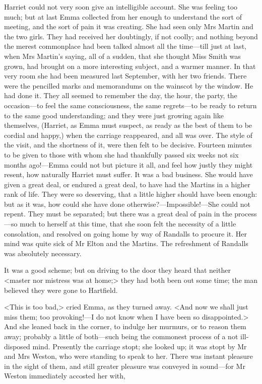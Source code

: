 Harriet could not very soon give an intelligible account. She was feeling too much; but at last Emma collected from her enough to understand the sort of meeting, and the sort of pain it was creating. She had seen only Mrs Martin and the two girls. They had received her doubtingly, if not coolly; and nothing beyond the merest commonplace had been talked almost all the time—till just at last, when Mrs Martin's saying, all of a sudden, that she thought Miss Smith was grown, had brought on a more interesting subject, and a warmer manner. In that very room she had been measured last September, with her two friends. There were the pencilled marks and memorandums on the wainscot by the window. He had done it. They all seemed to remember the day, the hour, the party, the occasion—to feel the same consciousness, the same regrets—to be ready to return to the same good understanding; and they were just growing again like themselves, (Harriet, as Emma must suspect, as ready as the best of them to be cordial and happy,) when the carriage reappeared, and all was over. The style of the visit, and the shortness of it, were then felt to be decisive. Fourteen minutes to be given to those with whom she had thankfully passed six weeks not six months ago!—Emma could not but picture it all, and feel how justly they might resent, how naturally Harriet must suffer. It was a bad business. She would have given a great deal, or endured a great deal, to have had the Martins in a higher rank of life. They were so deserving, that a little higher should have been enough: but as it was, how could she have done otherwise?—Impossible!—She could not repent. They must be separated; but there was a great deal of pain in the process—so much to herself at this time, that she soon felt the necessity of a little consolation, and resolved on going home by way of Randalls to procure it. Her mind was quite sick of Mr Elton and the Martins. The refreshment of Randalls was absolutely necessary.

It was a good scheme; but on driving to the door they heard that neither <master nor mistress was at home;> they had both been out some time; the man believed they were gone to Hartfield.

<This is too bad,> cried Emma, as they turned away. <And now we shall just miss them; too provoking!—I do not know when I have been so disappointed.> And she leaned back in the corner, to indulge her murmurs, or to reason them away; probably a little of both—such being the commonest process of a not ill-disposed mind. Presently the carriage stopt; she looked up; it was stopt by Mr and Mrs Weston, who were standing to speak to her. There was instant pleasure in the sight of them, and still greater pleasure was conveyed in sound—for Mr Weston immediately accosted her with,

